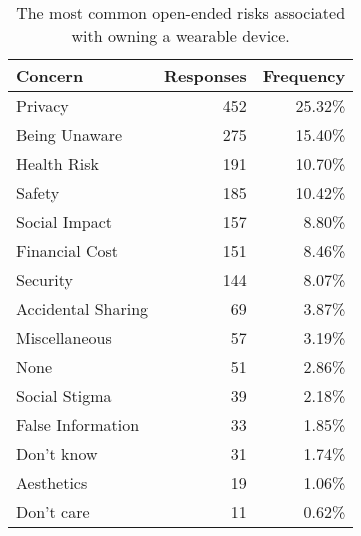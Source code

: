 \begin{table}[t]
\begin{center}
\begin{tabular}{|l|r|r|}
\hline
Concern &  Responses &  Frequency   \\
\hline
Privacy & 452 & 25.32\% \\
Being Unaware & 275 & 15.40\% \\
Health Risk & 191 & 10.70\%\\
Safety & 185 & 10.42\%\\
Social Impact &	157 & 8.80\%\\
Financial Cost & 151 & 8.46\%\\
Security &	144 & 8.07\%\\
Accidental Sharing &	69 & 3.87\%\\
Miscellaneous &	57 & 3.19\%\\
None	& 51 & 2.86\%\\
Social Stigma &	39 & 2.18\%\\
False Information & 33 & 1.85\%\\
Don't know & 31 & 1.74\%\\
Aesthetics 	& 19 & 1.06\%\\
Don't care 	& 11 & 0.62\%\\
\hline
\end{tabular}
\caption{The most common open-ended risks associated with owning a wearable device.}
\label{openresponses}
\end{center}
\end{table}